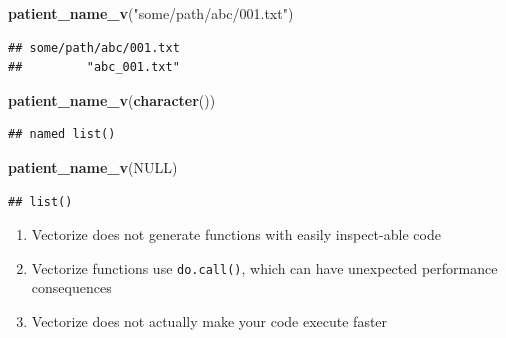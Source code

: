 \documentclass[]{book}
\newenvironment{Shaded}{\begin{snugshade}}{\end{snugshade}}
\newcommand{\KeywordTok}[1]{\textcolor[rgb]{0.13,0.29,0.53}{\textbf{#1}}}
\newcommand{\NormalTok}[1]{#1}
\newcommand{\OtherTok}[1]{\textcolor[rgb]{0.56,0.35,0.01}{#1}}
\newcommand{\StringTok}[1]{\textcolor[rgb]{0.31,0.60,0.02}{#1}}
\providecommand{\tightlist}{%
  \setlength{\itemsep}{0pt}\setlength{\parskip}{0pt}}
\begin{document}
\begin{Shaded}
\begin{Highlighting}[]
\KeywordTok{patient_name_v}\NormalTok{(}\StringTok{"some/path/abc/001.txt"}\NormalTok{)}
\end{Highlighting}
\end{Shaded}

\begin{verbatim}
## some/path/abc/001.txt 
##         "abc_001.txt"
\end{verbatim}

\begin{Shaded}
\begin{Highlighting}[]
\KeywordTok{patient_name_v}\NormalTok{(}\KeywordTok{character}\NormalTok{())}
\end{Highlighting}
\end{Shaded}

\begin{verbatim}
## named list()
\end{verbatim}

\begin{Shaded}
\begin{Highlighting}[]
\KeywordTok{patient_name_v}\NormalTok{(}\OtherTok{NULL}\NormalTok{)}
\end{Highlighting}
\end{Shaded}

\begin{verbatim}
## list()
\end{verbatim}

\begin{enumerate}
\def\labelenumi{\arabic{enumi}.}
\setcounter{enumi}{1}
\tightlist
\item
  Vectorize does not generate functions with easily inspect-able code
\item
  Vectorize functions use \texttt{do.call()}, which can have unexpected performance consequences
\item
  Vectorize does not actually make your code execute faster
\end{enumerate}


\end{document}
